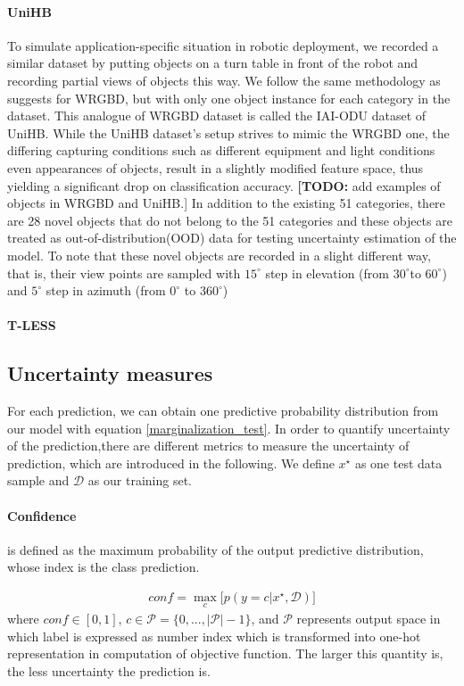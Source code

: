 \paragraph{UniHB} To simulate application-specific situation in robotic deployment, we recorded a similar dataset by putting objects on a turn table in front of the robot and recording partial views of objects this way. We follow the same methodology as \cite{lai2011large} suggests for WRGBD, but with only one object instance for each category in the dataset. This analogue of WRGBD dataset is called the IAI-ODU dataset of UniHB. While the UniHB dataset's setup strives to mimic the WRGBD one, the differing capturing conditions such as different equipment and light conditions even appearances of objects, result in a slightly modified feature space, thus yielding a significant drop on classification accuracy. \textbf{[TODO:} add examples of objects in WRGBD and UniHB.] In addition to the existing 51 categories, there are 28 novel objects that do not belong to the 51 categories and these objects are treated as out-of-distribution(OOD) data for testing uncertainty estimation of the model. To note that these novel objects are recorded in a slight different way, that is, their view points are sampled with $15^{\circ}$ step in elevation (from $30^{\circ}$to $60^{\circ}$) and $5^\circ$ step in azimuth (from $0^\circ$ to $360^\circ$)

\paragraph{T-LESS\cite{hodan2017tless}}


\subsection{Uncertainty measures}
For each prediction, we can obtain one predictive probability distribution from our model with equation \ref{marginalization_test}. In order to quantify uncertainty of the prediction,there are different metrics to measure the uncertainty of prediction, which are introduced in the following. We define $x^\star$ as one test data sample and $\mathcal D$ as our training set. 
\paragraph{Confidence} is defined as the maximum probability of the output predictive distribution, whose index is the class prediction.

\begin{equation}\label{confidence}	
\begin{aligned}
conf = \max_c \big[ p(y=c|x^\star, \mathcal D) \big]
\end{aligned}
\end{equation}
where $conf \in [0,1]$, $c \in \mathcal P = \{0,...,|\mathcal P|-1\}$, and $\mathcal P$ represents output space in which label is expressed as number index which is transformed into one-hot representation in computation of objective function. The larger this quantity is, the less uncertainty the prediction is. 

